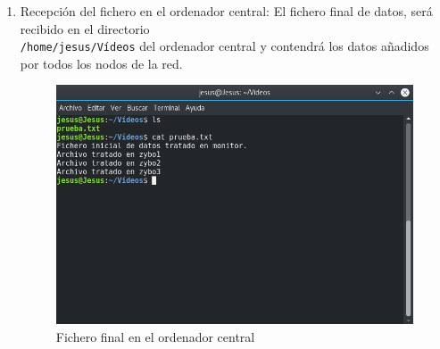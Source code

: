 \begin{enumerate}
\newpage
	\item Recepción del fichero en el ordenador central: El fichero final de datos, será recibido en el directorio\\ \texttt{/home/jesus/Vídeos} del ordenador central y contendrá los datos añadidos por todos los nodos de la red.
	\begin{figure}[h]
		\centering
		\includegraphics[scale=0.5]{Metodologia/Pruebas/Fichero_final_en_PC.png}
		\caption{Fichero final en el ordenador central}
		\label{Fichero final en el ordenador central}
	\end{figure}

\end{enumerate}